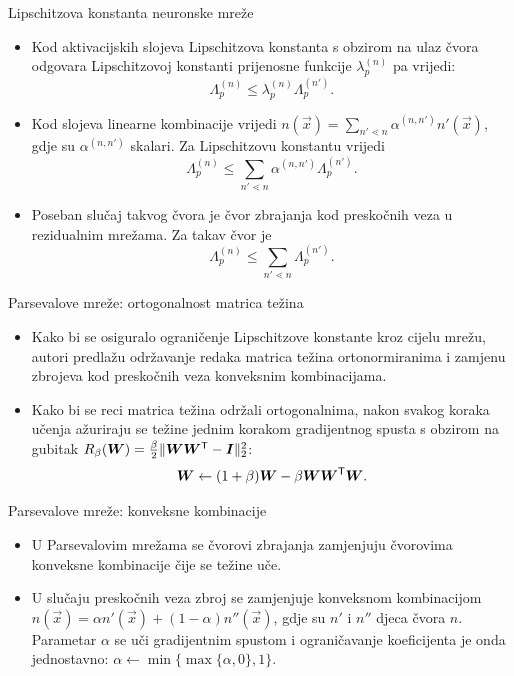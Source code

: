 \documentclass{beamer}
\begin{document}
\begin{frame}{Lipschitzova konstanta neuronske mreže}
\begin{itemize}
	\item Kod aktivacijskih slojeva Lipschitzova konstanta s obzirom na ulaz čvora odgovara Lipschitzovoj konstanti prijenosne funkcije $\lambda_p^{(n)}$ pa vrijedi:
	\begin{equation}
	\Lambda_p^{(n)} \leq \lambda_p^{(n)}\Lambda_p^{(n')}.
	\end{equation}
		
	\item Kod slojeva linearne kombinacije vrijedi $n(\vec x) = \sum_{n'\lessdot n}\alpha^{(n,n')}n'(\vec x)$, gdje su $\alpha^{(n,n')}$ skalari. Za Lipschitzovu konstantu vrijedi
	\begin{equation} \label{eq:linear-combination}
	\Lambda_p^{(n)} \leq \sum_{n'\lessdot n}\alpha^{(n,n')}\Lambda_p^{(n')}.
	\end{equation}
	\item Poseban slučaj takvog čvora je čvor zbrajanja kod preskočnih veza u rezidualnim mrežama. Za takav čvor je
	\begin{equation}
	\Lambda_p^{(n)} \leq \sum_{n'\lessdot n}\Lambda_p^{(n')}.
	\end{equation}
\end{itemize}
\end{frame}

\begin{frame}{Parsevalove mreže: ortogonalnost matrica težina}
\begin{itemize}
	\item Kako bi se osiguralo ograničenje Lipschitzove konstante kroz cijelu mrežu, autori predlažu održavanje redaka matrica težina ortonormiranima i zamjenu zbrojeva kod preskočnih veza konveksnim kombinacijama.
	\item Kako bi se reci matrica težina održali ortogonalnima, nakon svakog koraka učenja ažuriraju se težine jednim korakom gradijentnog spusta s obzirom na gubitak $R_\beta(\mat W) = \frac{\beta}{2}\lVert \mat W \mat W^\transpose-\mat I\rVert_2^2$:
	\begin{equation}
	\mat W \gets (1+\beta)\mat W-\beta \mat W\mat W^\transpose \mat W. 
	\end{equation}
\end{itemize}
\end{frame}

\begin{frame}{Parsevalove mreže: konveksne kombinacije}
\begin{itemize}
	\item U Parsevalovim mrežama se čvorovi zbrajanja zamjenjuju čvorovima konveksne kombinacije čije se težine uče.
	\item  U slučaju preskočnih veza zbroj se zamjenjuje konveksnom kombinacijom
	$n(\vec x) = \alpha n'(\vec x) + (1-\alpha)n''(\vec x)$, gdje su $n'$ i $n''$ djeca čvora $n$. Parametar $\alpha$ se uči gradijentnim spustom i  ograničavanje koeficijenta je onda jednostavno: $\alpha\gets\min\{\max\{\alpha, 0\},1\}$.
\end{itemize}
\end{frame}
\end{document}
